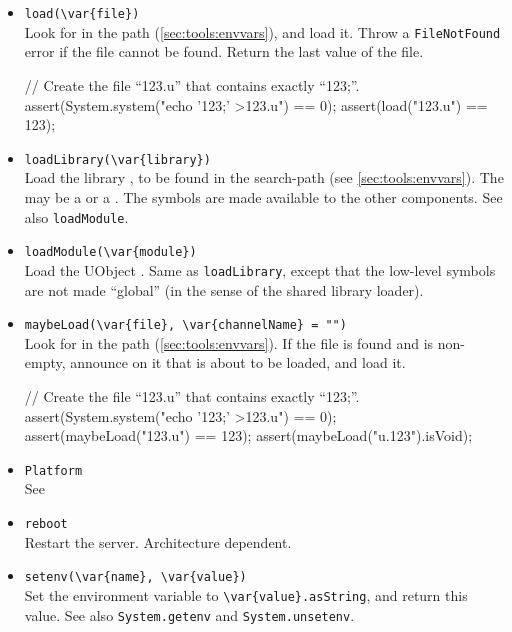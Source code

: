 \begin{itemize}
\item \lstinline|load(\var{file})|\\
  Look for  in the \urbi path (\autoref{sec:tools:envvars}),
  and load it.  Throw a \lstinline|FileNotFound| error if the file
  cannot be found.  Return the last value of the file.
\begin{urbiscript}[firstnumber=last]
// Create the file ``123.u'' that contains exactly ``123;''.
assert(System.system("echo '123;' >123.u") == 0);
assert(load("123.u") == 123);
\end{urbiscript}

\item \lstinline|loadLibrary(\var{library})|\\
  Load the library , to be found in the
   search-path (see
  \autoref{sec:tools:envvars}).  The  may be a
   or a .  The \Cxx symbols are made
  available to the other \Cxx components.  See also
  \lstinline|loadModule|.

\item \lstinline|loadModule(\var{module})|\\
  Load the UObject .  Same as \lstinline|loadLibrary|,
  except that the low-level \Cxx symbols are not made ``global'' (in
  the sense of the shared library loader).

\item \lstinline|maybeLoad(\var{file}, \var{channelName} = "")|\\
  Look for  in the \urbi path
  (\autoref{sec:tools:envvars}).  If the file is found and
   is non-empty, announce on it that  is
  about to be loaded, and load it.

\begin{urbiscript}[firstnumber=last]
// Create the file ``123.u'' that contains exactly ``123;''.
assert(System.system("echo '123;' >123.u") == 0);
assert(maybeLoad("123.u") == 123);
assert(maybeLoad("u.123").isVoid);
\end{urbiscript}

\item \lstinline|Platform|\\
  See 

\item \lstinline|reboot|\\
  Restart the \urbi server.  Architecture dependent.

\item \lstinline|setenv(\var{name}, \var{value})|\\
  Set the environment variable  to
  \lstinline|\var{value}.asString|, and return this value.  See also
  \lstinline|System.getenv| and \lstinline|System.unsetenv|.


\end{itemize}
